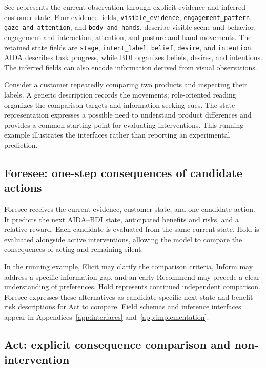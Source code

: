 \documentclass{article}
\begin{document}
See represents the current observation through explicit evidence and
inferred customer state. Four evidence fields,
\texttt{visible\_evidence}, \texttt{engagement\_pattern},
\texttt{gaze\_and\_attention}, and \texttt{body\_and\_hands}, describe
visible scene and behavior, engagement and interaction, attention, and
posture and hand movements. The retained state fields are
\texttt{stage}, \texttt{intent\_label}, \texttt{belief},
\texttt{desire}, and \texttt{intention}. AIDA describes task progress,
while BDI organizes beliefs, desires, and intentions. The inferred
fields can also encode information derived from visual observations.

Consider a customer repeatedly comparing two products and inspecting
their labels. A generic description records the movements; role-oriented
reading organizes the comparison targets and information-seeking cues.
The state representation expresses a possible need to understand product
differences and provides a common starting point for evaluating
interventions. This running example illustrates the interfaces rather
than reporting an experimental prediction.

\subsection{Foresee: one-step consequences of candidate
actions}\label{foresee-one-step-consequences-of-candidate-actions}

Foresee receives the current evidence, customer state, and one candidate
action. It predicts the next AIDA--BDI state, anticipated benefits and
risks, and a relative reward. Each candidate is evaluated from the same
current state. Hold is evaluated alongside active interventions,
allowing the model to compare the consequences of acting and remaining
silent.

In the running example, Elicit may clarify the comparison criteria,
Inform may address a specific information gap, and an early Recommend
may precede a clear understanding of preferences. Hold represents
continued independent comparison. Foresee expresses these alternatives
as candidate-specific next-state and benefit--risk descriptions for Act
to compare. Field schemas and inference interfaces appear in Appendices~\ref{app:interfaces} and~\ref{app:implementation}.

\subsection{Act: explicit consequence comparison and
non-intervention}\label{act-explicit-consequence-comparison-and-non-intervention}
\end{document}
